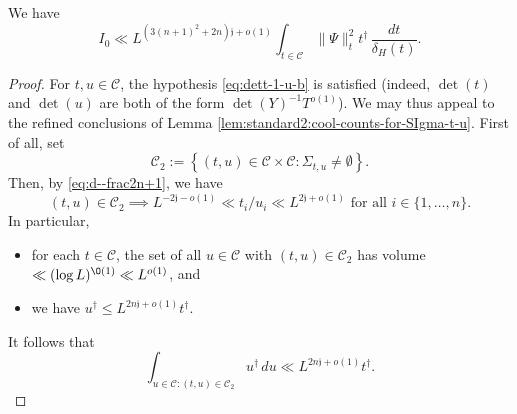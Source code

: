 \begin{lemma}
  We have
  \begin{equation}\label{eq:i_1-ll-l}
    I_0 \ll
    L^{(3(n+1)^2 + 2n) \mathfrak{j} + o(1)}
    \int_{t \in \mathcal{C} } \|\Psi\|_t^2
    t^\dagger  \, \frac{d t}{\delta_H(t)}.
  \end{equation}
\end{lemma}
\begin{proof}
  For $t,u \in \mathcal{C}$, the hypothesis \eqref{eq:dett-1-u-b} is satisfied (indeed, $\det(t)$ and $\det(u)$ are both of the form $\det(Y)^{-1} T^{o(1)}$).  We may thus appeal to the refined conclusions of Lemma \ref{lem:standard2:cool-counts-for-SIgma-t-u}.  First of all, set
  \begin{equation*}
    \mathcal{C}_2 := \left\{ (t,u) \in \mathcal{C} \times \mathcal{C} : \Sigma_{t,u} \neq \emptyset
    \right\}.
  \end{equation*}
  Then, by \eqref{eq:d--frac2n+1}, we have
  \begin{equation*}
    (t,u) \in \mathcal{C}_2 \implies
    L^{-2 \mathfrak{j} - o(1)} \ll t_i / u_i \ll L^{2 \mathfrak{j} + o(1)} \text{ for all } i \in \{1,\dotsc,n\}.
  \end{equation*}
  In particular,
  \begin{itemize}
  \item for each $t \in \mathcal{C}$, the set of all $u \in \mathcal{C}$ with $(t,u) \in \mathcal{C}_2$ has volume $\ll (\log L)^{\O(1)} \ll L^{o(1)}$, and
  \item we have $u^\dagger \leq L^{2 n \mathfrak{j} + o(1)} t^\dagger$.
  \end{itemize}
  It follows that
  \begin{equation}\label{eq:int-_u-in}
    \int_{u \in \mathcal{C} : (t,u) \in \mathcal{C}_2 }
    u^\dagger
    \, d u
    \ll  L^{2 n \mathfrak{j}  + o(1)} t^\dagger.
  \end{equation}


\end{proof}
